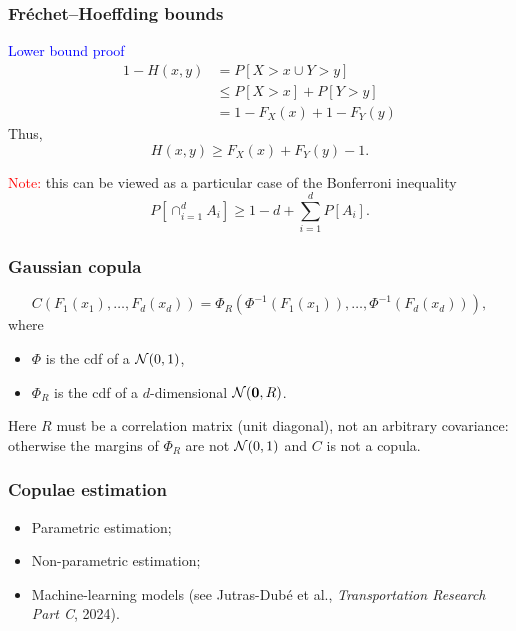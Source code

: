 \documentclass[aspectratio=169]{beamer}
\def\blue{\color{blue}}
\begin{document}
\begin{frame}
\frametitle{Fréchet–Hoeffding bounds}

\textcolor{blue}{Lower bound proof}
\begin{align*}
1 - H(x,y) &= P[X > x \cup Y > y] \\
& \leq P[X > x] + P[Y > y] \\
& = 1 - F_X(x) + 1 - F_Y(y)
\end{align*}
Thus,
$$
H(x,y) \geq F_X(x) + F_Y(y) - 1.
$$

\mbox{}

\textcolor{red}{Note:} this can be viewed as a particular case of the Bonferroni inequality
$$
P \left[ \cap_{i = 1}^d A_i \right] \geq 1-d+\sum_{i = 1}^d P [A_i].
$$

\end{frame}

\begin{frame}
\frametitle{Gaussian copula}

$$
	C \left( F_1(x_1), \ldots, F_d(x_d) \right)
	= \Phi_{R} \left( \Phi^{-1} \left( F_1(x_1) \right),\ldots, \Phi^{-1}\left( F_d(x_d) \right) \right),
$$
where
\begin{itemize}
	\item $\Phi$ is the cdf of a ${\mathcal{N}}(0,1)$,
	\item $\Phi_{R}$ is the cdf of a $d$-dimensional ${\mathcal{N}}({\boldsymbol{0}},R)$.
\end{itemize}

Here $R$ must be a {\blue correlation} matrix (unit diagonal), not an arbitrary
covariance: otherwise the margins of $\Phi_{R}$ are not ${\mathcal{N}}(0,1)$ and $C$ is
not a copula.

\end{frame}

\begin{frame}
\frametitle{Copulae estimation}

\begin{itemize}
	\item Parametric estimation;
	\item Non-parametric estimation;
	\item Machine-learning models (see Jutras-Dubé et al., \textit{Transportation Research Part C}, 2024).
\end{itemize}

\end{frame}
\end{document}
